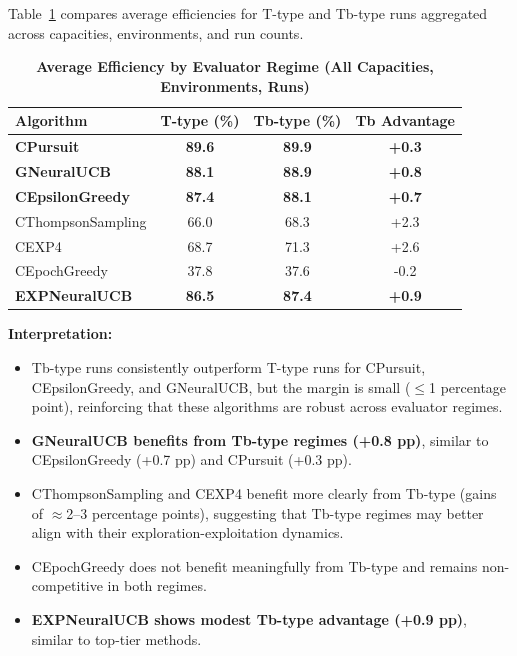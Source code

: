 \documentclass[12pt,a4paper]{article}
\newcommand{\performance}[1]{\textcolor{performancecolor}{\textbf{#1}}}
\newcommand{\legacy}[1]{\textcolor{legacycolor}{\textbf{#1}}}
\newcommand{\neural}[1]{\textcolor{neuralcolor}{\textbf{#1}}}
\begin{document}
Table~\ref{tab:regime-comparison} compares average efficiencies for T-type and Tb-type runs aggregated across capacities, environments, and run counts.

\begin{table}[H]
\centering
\caption{\performance{Average Efficiency by Evaluator Regime (All Capacities, Environments, Runs)}}
\label{tab:regime-comparison}
\begin{tabular}{|l|c|c|c|}
\hline
\textbf{Algorithm} & \textbf{T-type (\%)} & \textbf{Tb-type (\%)} & \textbf{Tb Advantage} \\
\hline
\hline
\performance{CPursuit}        & \performance{89.6} & \performance{89.9} & \performance{+0.3} \\
\neural{GNeuralUCB}          & \neural{88.1} & \neural{88.9} & \neural{+0.8} \\
\performance{CEpsilonGreedy} & \performance{87.4} & \performance{88.1} & \performance{+0.7} \\
CThompsonSampling            & 66.0              & 68.3              & +2.3 \\
CEXP4                        & 68.7              & 71.3              & +2.6 \\
CEpochGreedy                 & 37.8              & 37.6              & -0.2 \\
\legacy{EXPNeuralUCB}        & \legacy{86.5}     & \legacy{87.4}     & \legacy{+0.9} \\
\hline
\end{tabular}
\end{table}

\textbf{Interpretation:}
\begin{itemize}
\item Tb-type runs consistently outperform T-type runs for CPursuit, CEpsilonGreedy, and GNeuralUCB, but the margin is small ($\leq$1 percentage point), reinforcing that these algorithms are robust across evaluator regimes.
\item \neural{GNeuralUCB benefits from Tb-type regimes (+0.8 pp)}, similar to CEpsilonGreedy (+0.7 pp) and CPursuit (+0.3 pp).
\item CThompsonSampling and CEXP4 benefit more clearly from Tb-type (gains of $\approx$2–3 percentage points), suggesting that Tb-type regimes may better align with their exploration-exploitation dynamics.
\item CEpochGreedy does not benefit meaningfully from Tb-type and remains non-competitive in both regimes.
\item \legacy{EXPNeuralUCB shows modest Tb-type advantage (+0.9 pp)}, similar to top-tier methods.
\end{itemize}
\end{document}
